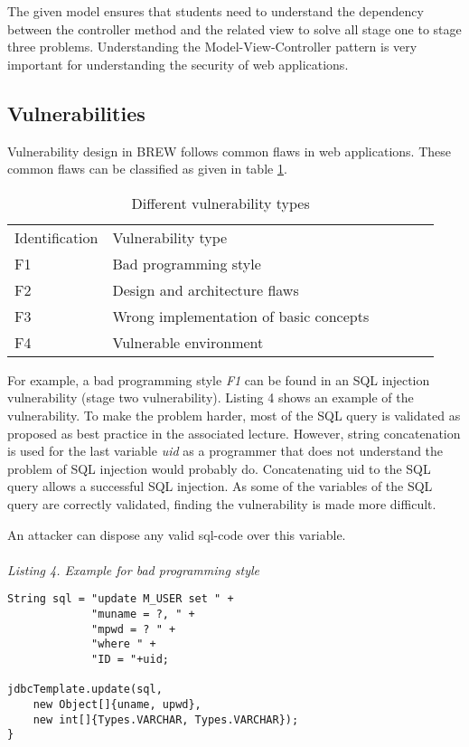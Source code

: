 \documentclass{llncs}
\begin{document}
The given model ensures that students need to understand the dependency between the controller method and the related view to solve all stage one to stage three problems.
Understanding the Model-View-Controller pattern is very important for understanding the security of web applications.


\subsection{Vulnerabilities}
Vulnerability design in BREW follows common flaws in web applications.
These common flaws can be classified as given in table \ref{tab:vulntype}.

\begin{table}
\centering
\caption{Different vulnerability types}
\label{tab:vulntype}
\begin{tabular}{llllll}
\hline\noalign{\smallskip}
Identification & Vulnerability type\\
\noalign{\smallskip}
\hline
\noalign{\smallskip}
F1 & Bad programming style\\
F2 & Design and architecture flaws\\
F3 & Wrong implementation of basic concepts\\
F4 & Vulnerable environment\\
\hline
\end{tabular}
\end{table}

For example, a bad programming style {\em F1} can be found in an  SQL injection vulnerability (stage two vulnerability). Listing 4 shows an example of the vulnerability. To make the problem harder, most of the SQL query is validated as proposed as best practice in the associated lecture. However, string concatenation is used for the last variable {\em uid} as a programmer that does not understand the problem of SQL injection would probably do. Concatenating uid to the SQL query allows a successful SQL injection. As some of the variables of the SQL query are correctly validated, finding the vulnerability is made more difficult.


An attacker can dispose any valid sql-code over this variable.
\\\\
\noindent
{\it Listing 4. Example for bad programming style }
\begin{small}
\begin{verbatim}
String sql = "update M_USER set " +
             "muname = ?, " +
             "mpwd = ? " +
             "where " +
             "ID = "+uid;

jdbcTemplate.update(sql, 
	new Object[]{uname, upwd}, 
	new int[]{Types.VARCHAR, Types.VARCHAR});
}
\end{verbatim}
\end{small}
\end{document}
